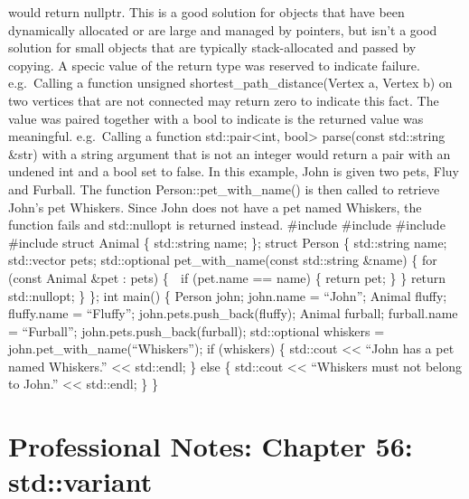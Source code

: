 would return nullptr. This is a good solution for objects that have been
dynamically allocated or are large and managed by pointers, but isn't a
good solution for small objects that are typically stack-allocated and
passed by copying. A specic value of the return type was reserved to
indicate failure. e.g.~Calling a function unsigned
shortest\_path\_distance(Vertex a, Vertex b) on two vertices that are
not connected may return zero to indicate this fact. The value was
paired together with a bool to indicate is the returned value was
meaningful. e.g.~Calling a function std::pair\textless int,
bool\textgreater{} parse(const std::string \&str) with a string argument
that is not an integer would return a pair with an undened int and a
bool set to false. In this example, John is given two pets, Fluy and
Furball. The function Person::pet\_with\_name() is then called to
retrieve John's pet Whiskers. Since John does not have a pet named
Whiskers, the function fails and std::nullopt is returned instead.
\#include \#include \#include \#include struct Animal \{ std::string
name; \}; struct Person \{ std::string name; std::vector pets;
std::optional pet\_with\_name(const std::string \&name) \{ for (const
Animal \&pet : pets) \{  if (pet.name == name) \{ return pet; \} \}
return std::nullopt; \} \}; int main() \{ Person john; john.name =
``John''; Animal fluffy; fluffy.name = ``Fluffy'';
john.pets.push\_back(fluffy); Animal furball; furball.name =
``Furball''; john.pets.push\_back(furball); std::optional whiskers =
john.pet\_with\_name(``Whiskers''); if (whiskers) \{ std::cout
\textless\textless{} ``John has a pet named Whiskers.''
\textless\textless{} std::endl; \} else \{ std::cout
\textless\textless{} ``Whiskers must not belong to John.''
\textless\textless{} std::endl; \} \}

\hypertarget{professional-notes-chapter-56-stdvariant-1}{%
\section{Professional Notes: Chapter 56:
std::variant}\label{professional-notes-chapter-56-stdvariant-1}}

